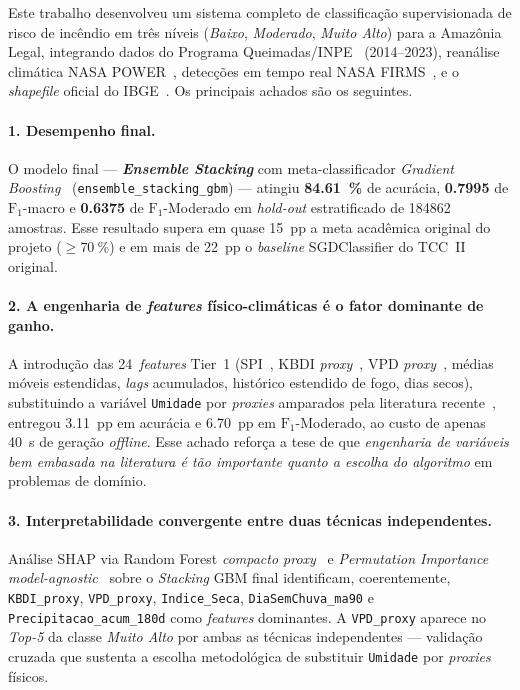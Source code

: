 Este trabalho desenvolveu um sistema completo de classificação supervisionada de risco de incêndio em três níveis (\emph{Baixo}, \emph{Moderado}, \emph{Muito Alto}) para a Amazônia Legal, integrando dados do Programa Queimadas/INPE~\cite{INPE24} (2014--2023), reanálise climática NASA POWER~\cite{nasapower}, detecções em tempo real NASA FIRMS~\cite{nasafirms}, e o \emph{shapefile} oficial do IBGE~\cite{ibgeamazonia2024}. Os principais achados são os seguintes.

\paragraph{1. Desempenho final.} O modelo final --- \textbf{\emph{Ensemble Stacking}} com meta-classificador \emph{Gradient Boosting}~\cite{friedman2001greedy,wolpert1992stacked} (\texttt{ensemble\_stacking\_gbm}) --- atingiu \textbf{\SI{84,61}{\percent}} de acurácia, \textbf{\num{0,7995}} de \(\text{F}_1\)-macro e \textbf{\num{0,6375}} de \(\text{F}_1\)-Moderado em \emph{hold-out} estratificado de \num{184862} amostras. Esse resultado supera em quase \SI{15}{pp} a meta acadêmica original do projeto (\(\geq \SI{70}{\percent}\)) e em mais de \SI{22}{pp} o \emph{baseline} SGDClassifier do TCC~II original.

\paragraph{2. A engenharia de \emph{features} físico-climáticas é o fator dominante de ganho.} A introdução das 24~\emph{features} Tier~1 (SPI~\cite{mckee1993spi}, KBDI \emph{proxy}~\cite{keetch1968drought}, VPD \emph{proxy}~\cite{seager2015climatology}, médias móveis estendidas, \emph{lags} acumulados, histórico estendido de fogo, dias secos), substituindo a variável \texttt{Umidade} por \emph{proxies} amparados pela literatura recente~\cite{seager2015climatology,forests2024cerradoamazon,npjhazards2025fire}, entregou \SI{+3,11}{pp} em acurácia e \SI{+6,70}{pp} em \(\text{F}_1\)-Moderado, ao custo de apenas \SI{40}{\second} de geração \emph{offline}. Esse achado reforça a tese de que \emph{engenharia de variáveis bem embasada na literatura é tão importante quanto a escolha do algoritmo} em problemas de domínio.

\paragraph{3. Interpretabilidade convergente entre duas técnicas independentes.} Análise SHAP via Random Forest \emph{compacto proxy}~\cite{lundberg2017unified,lundberg2020local} e \emph{Permutation Importance} \emph{model-agnostic}~\cite{breiman2001random,fisher2019all} sobre o \emph{Stacking} GBM final identificam, coerentemente, \texttt{KBDI\_proxy}, \texttt{VPD\_proxy}, \texttt{Indice\_Seca}, \texttt{DiaSemChuva\_ma90} e \texttt{Precipitacao\_acum\_180d} como \emph{features} dominantes. A \texttt{VPD\_proxy} aparece no \emph{Top-5} da classe \emph{Muito Alto} por ambas as técnicas independentes --- validação cruzada que sustenta a escolha metodológica de substituir \texttt{Umidade} por \emph{proxies} físicos.

